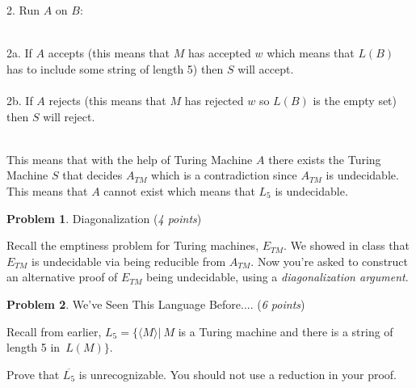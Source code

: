 \documentclass[11pt]{article}
\theoremstyle{definition}
\theoremstyle{theorem}
\newtheorem{prob}{Problem}
\newcommand{\solution}{\medskip\noindent{\color{blue}\textbf{Solution:}}}
\begin{document}
2. Run $A$ on $B$: \\~\\
\hspace*{0.9cm}
\begin{minipage}{.8\textwidth}
2a. If $A$ accepts (this means that $M$ has accepted $w$ which means that $L(B)$ has to include some string of length 5) then $S$ will accept. \\~\\
2b. If $A$ rejects (this means that $M$ has rejected $w$ so $L(B)$ is the empty set) then $S$ will reject. \\~\\
\end{minipage}

\noindent This means that with the help of Turing Machine $A$ there exists the Turing Machine $S$ that decides $A_{TM}$ which is a contradiction since $A_{TM}$ is undecidable. This means that $A$ cannot exist which means that $L_5$ is undecidable.




\newpage


\begin{prob} Diagonalization (\emph{4 points}) \end{prob}

Recall the emptiness problem for Turing machines, $E_{TM}$. We showed in class that  $E_{TM}$ is undecidable via being reducible from $A_{TM}$. Now you're asked to construct an alternative proof of $E_{TM}$ being undecidable, using a \emph{diagonalization argument}. 

\solution






\newpage

\begin{prob} We've Seen This Language Before.... (\emph{6 points})\end{prob}

Recall from earlier, $L_{5} = \{\langle M \rangle | ~M $  is a Turing machine and there is a string of length 5 in~$ L(M)\}$.

Prove that $\overline{L_{5}}$ is unrecognizable. You should not use a reduction in your proof.



\solution
\end{document}
